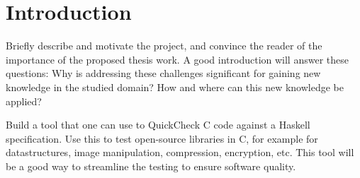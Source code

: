 \section{Introduction}

Briefly describe and motivate the project, and convince the reader of the importance of the proposed thesis work.
A good introduction will answer these questions:
Why is addressing these challenges significant for gaining new knowledge in the studied domain?
How and where can this new knowledge be applied?

Build a tool that one can use to QuickCheck C code against a Haskell specification. Use this to test open-source libraries in C,
for example for datastructures, image manipulation, compression, encryption, etc.
This tool will be a good way to streamline the testing to ensure software quality.
